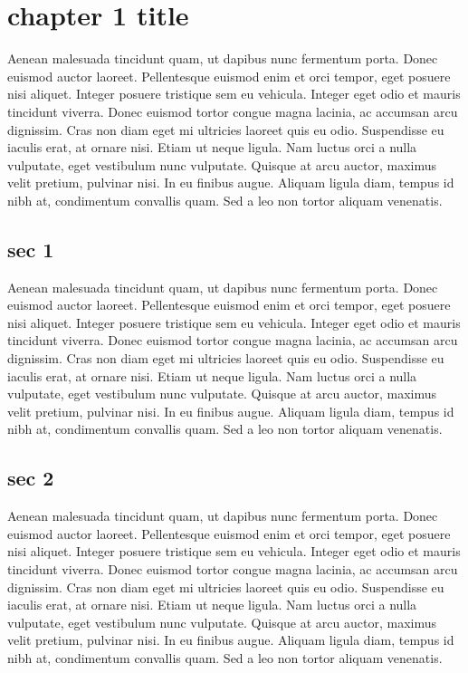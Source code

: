 \chapter{chapter 1 title}

Aenean malesuada tincidunt quam, ut dapibus nunc fermentum porta. Donec euismod auctor laoreet. Pellentesque euismod enim et orci tempor, eget posuere nisi aliquet. Integer posuere tristique sem eu vehicula. Integer eget odio et mauris tincidunt viverra. Donec euismod tortor congue magna lacinia, ac accumsan arcu dignissim. Cras non diam eget mi ultricies laoreet quis eu odio. Suspendisse eu iaculis erat, at ornare nisi. Etiam ut neque ligula. Nam luctus orci a nulla vulputate, eget vestibulum nunc vulputate. Quisque at arcu auctor, maximus velit pretium, pulvinar nisi. In eu finibus augue. Aliquam ligula diam, tempus id nibh at, condimentum convallis quam. Sed a leo non tortor aliquam venenatis.


\section{sec 1}
Aenean malesuada tincidunt quam, ut dapibus nunc fermentum porta. Donec euismod auctor laoreet. Pellentesque euismod enim et orci tempor, eget posuere nisi aliquet. Integer posuere tristique sem eu vehicula. Integer eget odio et mauris tincidunt viverra. Donec euismod tortor congue magna lacinia, ac accumsan arcu dignissim. Cras non diam eget mi ultricies laoreet quis eu odio. Suspendisse eu iaculis erat, at ornare nisi. Etiam ut neque ligula. Nam luctus orci a nulla vulputate, eget vestibulum nunc vulputate. Quisque at arcu auctor, maximus velit pretium, pulvinar nisi. In eu finibus augue. Aliquam ligula diam, tempus id nibh at, condimentum convallis quam. Sed a leo non tortor aliquam venenatis.

\section{sec 2}
Aenean malesuada tincidunt quam, ut dapibus nunc fermentum porta. Donec euismod auctor laoreet. Pellentesque euismod enim et orci tempor, eget posuere nisi aliquet. Integer posuere tristique sem eu vehicula. Integer eget odio et mauris tincidunt viverra. Donec euismod tortor congue magna lacinia, ac accumsan arcu dignissim. Cras non diam eget mi ultricies laoreet quis eu odio. Suspendisse eu iaculis erat, at ornare nisi. Etiam ut neque ligula. Nam luctus orci a nulla vulputate, eget vestibulum nunc vulputate. Quisque at arcu auctor, maximus velit pretium, pulvinar nisi. In eu finibus augue. Aliquam ligula diam, tempus id nibh at, condimentum convallis quam. Sed a leo non tortor aliquam venenatis.

